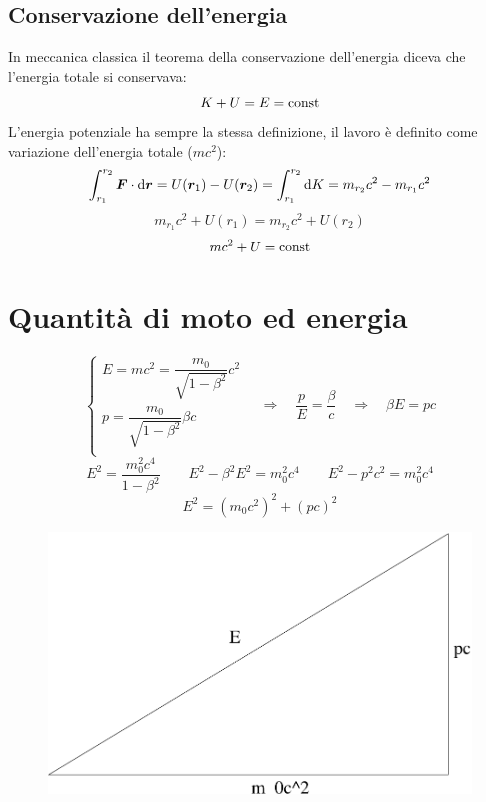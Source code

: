 \subsection{Conservazione dell'energia}
In meccanica classica il teorema della conservazione dell'energia diceva che l'energia totale si conservava:
\begin{equation*}K+U=E=\text{const}\end{equation*}
L'energia potenziale ha sempre la stessa definizione, il lavoro è definito come variazione dell'energia totale ($mc^2$):
\begin{equation*}\int_{r_1}^{r_2}\boldsymbol{F}\cdot \mathrm{d}\boldsymbol{r}=U(\boldsymbol{r}_1)-U(\boldsymbol{r}_2)=\int_{r_1}^{r_2}\mathrm{d} K=m_{r_2}c^2-m_{r_1}c^2\end{equation*}
\begin{equation*}m_{r_1}c^2+U(r_1)=m_{r_2}c^2+U(r_2)\end{equation*}
\begin{equation*}mc^2+U=\text{const}\end{equation*}

\section{Quantità di moto ed energia}
\begin{equation*}\left\{
\begin{array}{l}
E=mc^2=\dfrac{m_0}{\sqrt{1-\beta^2}}c^2\\
p=\dfrac{m_0}{\sqrt{1-\beta^2}}\beta c\\
\end{array}\right.
\quad\Rightarrow\quad
\dfrac{p}{E}=\dfrac{\beta}{c}
\quad\Rightarrow\quad\beta E=pc
\end{equation*}
\begin{equation*}E^2=\frac{m_0^2c^4}{1-\beta^2}\qquad E^2-\beta^2 E^2=m_0^2c^4\qquad E^2-p^2c^2=m_0^2c^4\end{equation*}
\begin{equation*}E^2=(m_0c^2)^2+(pc)^2\end{equation*}
\begin{figure}[htbp]
   \centering
   \includegraphics[scale=0.4]{immagini/fisica1/Trg_rel}
\end{figure}

